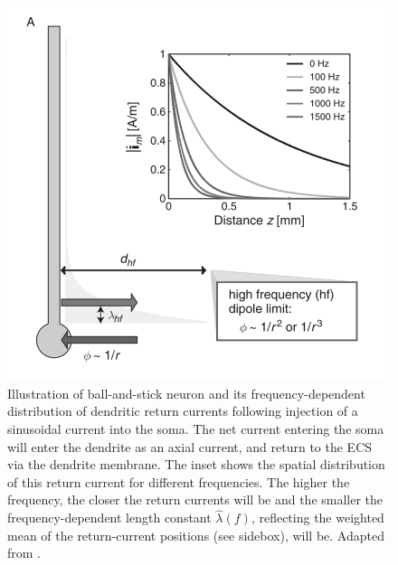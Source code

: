 \begin{figure}[!ht]
\begin{center}
\includegraphics{Figures/Spikes/Spikes-ball-and-stick-sketch-w70-r300}
\end{center}
\caption[]{Illustration of ball-and-stick neuron and its frequency-dependent 
distribution of dendritic return currents following injection of a sinusoidal current into the soma.
The net current entering the soma will enter the dendrite as an axial current, and return to the 
ECS via the dendrite membrane. The inset shows the spatial distribution of this return current
for different frequencies. The higher the frequency, the closer the return currents will be and
the smaller the frequency-dependent length constant $\hat{\lambda}(f)$, reflecting the weighted mean 
of the return-current positions (see sidebox), will be. 
 Adapted from \citet{Pettersen2012}.
}
\label{Spikes:fig:ball-and-stick-sketch}
\end{figure}
%

